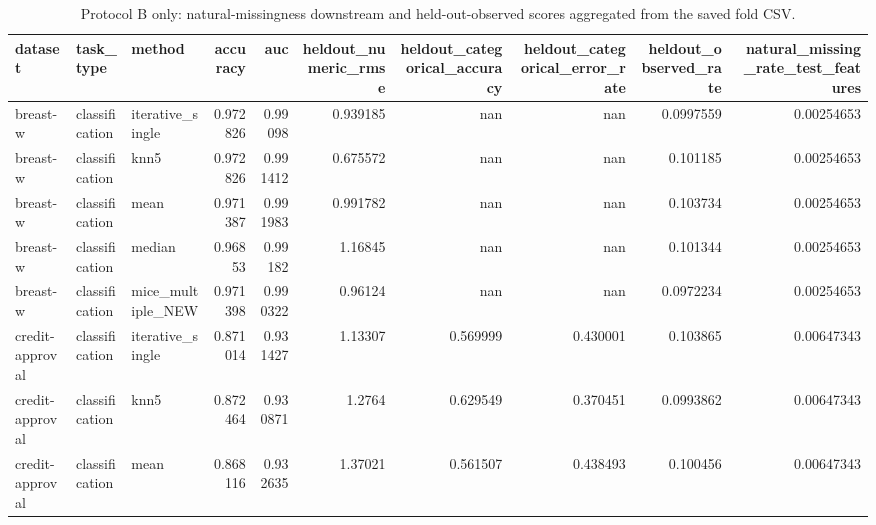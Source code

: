 \begin{table}[ht]
\centering
\caption{Protocol B only: natural-missingness downstream and held-out-observed scores aggregated from the saved fold CSV.}
\label{tab:protocol_b_natural_missingness_summary}
\begin{tabular}{lllrrrrrrr}
\hline
 dataset         & task\_type      & method            &   accuracy &      auc &   heldout\_numeric\_rmse &   heldout\_categorical\_accuracy &   heldout\_categorical\_error\_rate &   heldout\_observed\_rate &   natural\_missing\_rate\_test\_features \\
\hline
 breast-w        & classification & iterative\_single  &   0.972826 & 0.99098  &               0.939185 &                     nan        &                       nan        &               0.0997559 &                           0.00254653 \\
 breast-w        & classification & knn5              &   0.972826 & 0.991412 &               0.675572 &                     nan        &                       nan        &               0.101185  &                           0.00254653 \\
 breast-w        & classification & mean              &   0.971387 & 0.991983 &               0.991782 &                     nan        &                       nan        &               0.103734  &                           0.00254653 \\
 breast-w        & classification & median            &   0.96853  & 0.99182  &               1.16845  &                     nan        &                       nan        &               0.101344  &                           0.00254653 \\
 breast-w        & classification & mice\_multiple\_NEW &   0.971398 & 0.990322 &               0.96124  &                     nan        &                       nan        &               0.0972234 &                           0.00254653 \\
 credit-approval & classification & iterative\_single  &   0.871014 & 0.931427 &               1.13307  &                       0.569999 &                         0.430001 &               0.103865  &                           0.00647343 \\
 credit-approval & classification & knn5              &   0.872464 & 0.930871 &               1.2764   &                       0.629549 &                         0.370451 &               0.0993862 &                           0.00647343 \\
 credit-approval & classification & mean              &   0.868116 & 0.932635 &               1.37021  &                       0.561507 &                         0.438493 &               0.100456  &                           0.00647343 \\

\end{tabular}
\end{table}
